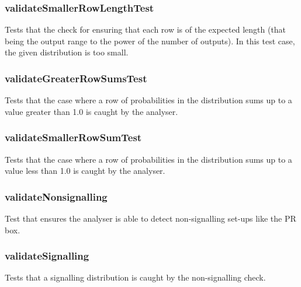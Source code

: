 \documentclass[report.tex]{subfiles}
\begin{document}
\subsubsection{validateSmallerRowLengthTest} %
\label{ssub:validatesmallerrowlengthtest}
Tests that the check for ensuring that each row is of the expected length (that
being the output range to the power of the number of outputs). In this test
case, the given distribution is too small.

\subsubsection{validateGreaterRowSumsTest} %
\label{ssub:validategreaterrowsumstest}
Tests that the case where a row of probabilities in the distribution sums up to
a value greater than 1.0 is caught by the analyser.
\subsubsection{validateSmallerRowSumTest} %
\label{ssub:validatesmallerrowsumtest}
Tests that the case where a row of probabilities in the distribution sums up to
a value less than 1.0 is caught by the analyser.

\subsubsection{validateNonsignalling} %
\label{ssub:validatenonsignalling}
Test that ensures the analyser is able to detect non-signalling set-ups like the
PR box.

\subsubsection{validateSignalling} %
\label{ssub:validatesignalling}
Tests that a signalling distribution is caught by the non-signalling check.
\newpage
\end{document}
